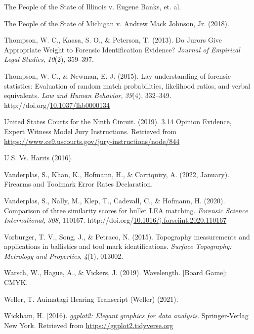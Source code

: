 \documentclass[print]{nuthesis}
\newlength{\cslhangindent}
\newenvironment{CSLReferences}[2]%
{\setlength{\parindent}{0pt}%
\everypar{\setlength{\hangindent}{\cslhangindent}}\ignorespaces}%
{\par}
\begin{document}
\begin{CSLReferences}{1}{0}
\leavevmode{}%
The {People} of the {State} of {Illinois} v. Eugene {Banks}, et. al.

\leavevmode{}%
The {People} of the {State} of {Michigan} v. Andrew {Mack} {Johnson}, {Jr.} (2018).

\leavevmode{}%
Thompson, W. C., Kaasa, S. O., \& Peterson, T. (2013). Do {Jurors} {Give} {Appropriate} {Weight} to {Forensic} {Identification} {Evidence}? \emph{Journal of Empirical Legal Studies}, \emph{10}(2), 359--397.

\leavevmode{}%
Thompson, W. C., \& Newman, E. J. (2015). Lay understanding of forensic statistics: {Evaluation} of random match probabilities, likelihood ratios, and verbal equivalents. \emph{Law and Human Behavior}, \emph{39}(4), 332--349. http://doi.org/\href{https://doi.org/10.1037/lhb0000134}{10.1037/lhb0000134}

\leavevmode{}%
United States Courts for the Ninth Circuit. (2019). 3.14 {Opinion} {Evidence}, {Expert} {Witness} {\textbar} {Model} {Jury} {Instructions}. Retrieved from \url{https://www.ce9.uscourts.gov/jury-instructions/node/844}

\leavevmode{}%
{U.S.} Vs. {Harris} (2016).

\leavevmode{}%
Vanderplas, S., Khan, K., Hofmann, H., \& Carriquiry, A. (2022, January). Firearms and {Toolmark} {Error} {Rates} {Declaration}.

\leavevmode{}%
Vanderplas, S., Nally, M., Klep, T., Cadevall, C., \& Hofmann, H. (2020). Comparison of three similarity scores for bullet {LEA} matching. \emph{Forensic Science International}, \emph{308}, 110167. http://doi.org/\href{https://doi.org/10.1016/j.forsciint.2020.110167}{10.1016/j.forsciint.2020.110167}

\leavevmode{}%
Vorburger, T. V., Song, J., \& Petraco, N. (2015). Topography measurements and applications in ballistics and tool mark identifications. \emph{Surface Topography: Metrology and Properties}, \emph{4}(1), 013002.

\leavevmode{}%
Warsch, W., Hague, A., \& Vickers, J. (2019). Wavelength. {[}Board Game{]}; {CMYK}.

\leavevmode{}%
Weller, T. {Auimatagi} {Hearing} {Transcript} ({Weller}) (2021).

\leavevmode{}%
Wickham, H. (2016). \emph{ggplot2: Elegant graphics for data analysis}. Springer-Verlag New York. Retrieved from \url{https://ggplot2.tidyverse.org}

\end{CSLReferences}
\end{document}
